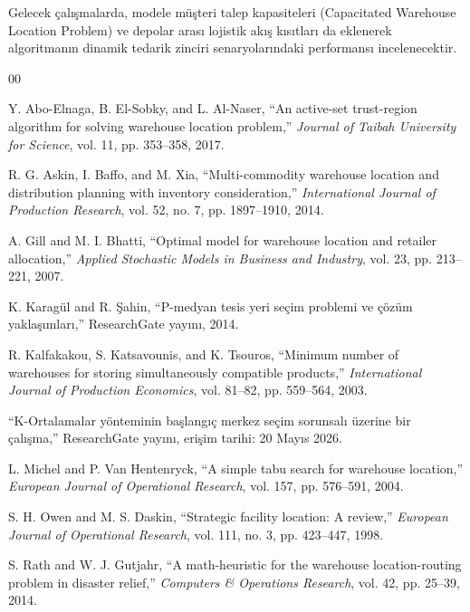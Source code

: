 \documentclass[conference]{IEEEtran}
\begin{document}
Gelecek çalışmalarda, modele müşteri talep kapasiteleri (Capacitated Warehouse Location Problem) ve depolar arası lojistik akış kısıtları da eklenerek algoritmanın dinamik tedarik zinciri senaryolarındaki performansı incelenecektir.


\begin{thebibliography}{00}
 
Y. Abo-Elnaga, B. El-Sobky, and L. Al-Naser,
``An active-set trust-region algorithm for solving warehouse location problem,''
\textit{Journal of Taibah University for Science},
vol. 11, pp. 353--358, 2017.
 
R. G. Askin, I. Baffo, and M. Xia,
``Multi-commodity warehouse location and distribution planning with inventory consideration,''
\textit{International Journal of Production Research},
vol. 52, no. 7, pp. 1897--1910, 2014.
 
A. Gill and M. I. Bhatti,
``Optimal model for warehouse location and retailer allocation,''
\textit{Applied Stochastic Models in Business and Industry},
vol. 23, pp. 213--221, 2007.
 
K. Karagül and R. Şahin,
``P-medyan tesis yeri seçim problemi ve çözüm yaklaşımları,'' 
ResearchGate yayını, 2014.
 
R. Kalfakakou, S. Katsavounis, and K. Tsouros,
``Minimum number of warehouses for storing simultaneously compatible products,''
\textit{International Journal of Production Economics},
vol. 81--82, pp. 559--564, 2003.
 
``K-Ortalamalar yönteminin başlangıç merkez seçim sorunsalı üzerine bir çalışma,''
ResearchGate yayını, erişim tarihi: 20 Mayıs 2026.
 
L. Michel and P. Van Hentenryck,
``A simple tabu search for warehouse location,''
\textit{European Journal of Operational Research},
vol. 157, pp. 576--591, 2004.
 
S. H. Owen and M. S. Daskin,
``Strategic facility location: A review,''
\textit{European Journal of Operational Research},
vol. 111, no. 3, pp. 423--447, 1998.
 
S. Rath and W. J. Gutjahr,
``A math-heuristic for the warehouse location-routing problem in disaster relief,''
\textit{Computers \& Operations Research},
vol. 42, pp. 25--39, 2014.
 

\end{thebibliography}
\end{document}
